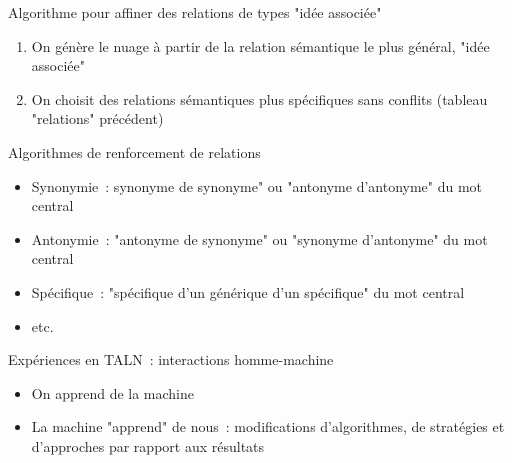 \documentclass{beamer}
\begin{document}
\begin{frame}
  Algorithme pour affiner des relations de types "idée associée"
  \begin{enumerate}
  \item On génère le nuage à partir de la relation sémantique le plus général, "idée associée"
  \item On choisit des relations sémantiques plus spécifiques sans conflits (tableau "relations" précédent)
  \end{enumerate}  
\end{frame}

\begin{frame}
  Algorithmes de renforcement de relations
\begin{itemize}
\item Synonymie~: synonyme de synonyme" ou "antonyme d'antonyme" du mot central
\item Antonymie~: "antonyme de synonyme" ou "synonyme d'antonyme" du mot central
\item Spécifique~: "spécifique d'un générique d'un spécifique" du mot central 
\item etc.
\end{itemize}
\end{frame}


\begin{frame}
  Expériences en TALN~: interactions homme-machine
\begin{itemize}
\item On apprend de la machine
\item La machine "apprend" de nous~: modifications d'algorithmes, de stratégies et d'approches par rapport aux résultats
\end{itemize}
\end{frame}
\end{document}
